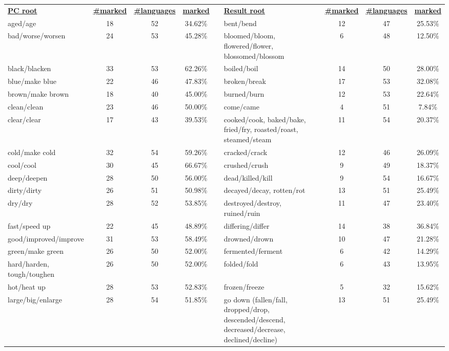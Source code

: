 \begin{tabular}{p{3cm}ccccp{3cm}ccc}
\underline{\textbf{PC root}} & \underline{\textbf{\#marked}} & \underline{\textbf{\#languages}} & \underline{\textbf{marked}} & & \underline{\textbf{Result root}} & \underline{\textbf{\#marked}} & \underline{\textbf{\#languages}} & \underline{\textbf{marked}} \\
aged/age & 18 & 52 & 34.62\% & & bent/bend & 12 & 47 & 25.53\% \\
bad/worse/worsen & 24 & 53 & 45.28\% & & bloomed/bloom, flowered/flower, blossomed/blossom & 6 & 48 & 12.50\% \\
black/blacken & 33 & 53 & 62.26\% & & boiled/boil & 14 & 50 & 28.00\% \\
blue/make blue & 22 & 46 & 47.83\% & & broken/break & 17 & 53 & 32.08\% \\
brown/make brown & 18 & 40 & 45.00\% & & burned/burn & 12 & 53 & 22.64\% \\
clean/clean & 23 & 46 & 50.00\% & & come/came & 4 & 51 & 7.84\% \\
clear/clear & 17 & 43 & 39.53\% & & cooked/cook, baked/bake, fried/fry, roasted/roast, steamed/steam & 11 & 54 & 20.37\% \\
cold/make cold & 32 & 54 & 59.26\% & & cracked/crack & 12 & 46 & 26.09\% \\
cool/cool & 30 & 45 & 66.67\% & & crushed/crush & 9 & 49 & 18.37\% \\
deep/deepen & 28 & 50 & 56.00\% & & dead/killed/kill & 9 & 54 & 16.67\% \\
dirty/dirty & 26 & 51 & 50.98\% & & decayed/decay, rotten/rot & 13 & 51 & 25.49\% \\
dry/dry & 28 & 52 & 53.85\% & & destroyed/destroy, ruined/ruin & 11 & 47 & 23.40\% \\
fast/speed up & 22 & 45 & 48.89\% & & differing/differ & 14 & 38 & 36.84\% \\
good/improved/improve & 31 & 53 & 58.49\% & & drowned/drown & 10 & 47 & 21.28\% \\
green/make green & 26 & 50 & 52.00\% & & fermented/ferment & 6 & 42 & 14.29\% \\
hard/harden, tough/toughen & 26 & 50 & 52.00\% & & folded/fold & 6 & 43 & 13.95\% \\
hot/heat up & 28 & 53 & 52.83\% & & frozen/freeze & 5 & 32 & 15.62\% \\
large/big/enlarge & 28 & 54 & 51.85\% & & go down (fallen/fall, dropped/drop, descended/descend, decreased/decrease, declined/decline) & 13 & 51 & 25.49\% \\

\end{tabular}
